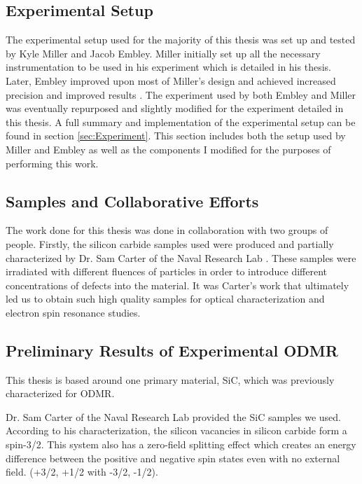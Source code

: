 \documentclass[oneside, noacknowlegments]{BYUPhys}
\begin{document}
\subsection{Experimental Setup}

The experimental setup used for the majority of this thesis was set up and tested by Kyle Miller and Jacob Embley. Miller initially set up all the necessary instrumentation to be used in his experiment which is detailed in his thesis. Later, Embley improved upon most of Miller's design and achieved increased precision and improved results \cite{RefWorks:doc:5892912ae4b0dec22aee3993}. The experiment used by both Embley and Miller was eventually repurposed and slightly modified for the experiment detailed in this thesis. A full summary and implementation of the experimental setup can be found in section \ref{sec:Experiment}. This section includes both the setup used by Miller and Embley as well as the components I modified for the purposes of performing this work.

\subsection{Samples and Collaborative Efforts}

The work done for this thesis was done in collaboration with two groups of people. Firstly, the silicon carbide samples used were produced and partially characterized by Dr. Sam Carter of the Naval Research Lab \cite{RefWorks:doc:5892964ee4b0499fa95c5108}. These samples were irradiated with different fluences of particles in order to introduce different concentrations of defects into the material. It was Carter's work that ultimately led us to obtain such high quality samples for optical characterization and electron spin resonance studies.

\subsection{Preliminary Results of Experimental ODMR}

This thesis is based around one primary material, SiC, which was previously characterized for ODMR.

Dr. Sam Carter of the Naval Research Lab provided the SiC samples we used. According to his characterization, the silicon vacancies in silicon carbide form a spin-3/2. This system also has a zero-field splitting effect which creates an energy difference between the positive and negative spin states even with no external field. (+3/2, +1/2 with -3/2, -1/2).
 
\end{document}
